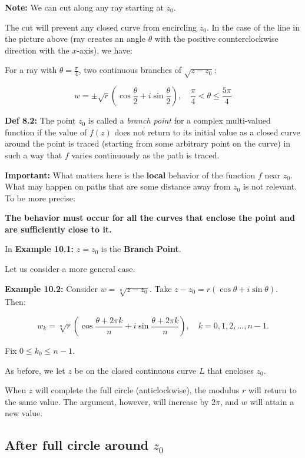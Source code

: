 \documentclass{article}
\begin{document}
\textbf{Note:} We can cut along any ray starting at \( z_0 \).

The cut will prevent any closed curve from encircling \( z_0 \). In the case of the line in the picture above (ray creates an angle \( \theta \) with the positive counterclockwise direction with the \( x \)-axis), we have:

For a ray with \( \theta = \frac{\pi}{4} \), two continuous branches of \( \sqrt{z - z_0} \):

\[
    w = \pm \sqrt{r} (\cos \frac{\theta}{2} + i \sin \frac{\theta}{2}), \quad \frac{\pi}{4} < \theta \leq \frac{5\pi}{4}
\]

\textbf{Def 8.2:} The point \( z_0 \) is called a \textit{branch point} for a complex multi-valued function if the value of \( f(z) \) does not return to its initial value as a closed curve around the point is traced (starting from some arbitrary point on the curve) in such a way that \( f \) varies continuously as the path is traced.

\textbf{Important:} What matters here is the \textbf{local} behavior of the function \( f \) near \( z_0 \). What may happen on paths that are some distance away from \( z_0 \) is not relevant. To be more precise:

\textbf{The behavior must occur for all the curves that enclose the point and are sufficiently close to it.}

In \textbf{Example 10.1:} \( z = z_0 \) is the \textbf{Branch Point}.

Let us consider a more general case.

\textbf{Example 10.2:} Consider \( w = \sqrt[n]{z - z_0} \). Take \( z - z_0 = r (\cos \theta + i \sin \theta) \). Then:

\[
w_k = \sqrt[n]{r} \left( \cos \frac{\theta + 2\pi k}{n} + i \sin \frac{\theta + 2\pi k}{n} \right), \quad k = 0,1,2, \dots, n-1.
\]

Fix \( 0 \leq k_0 \leq n-1 \).

As before, we let \( z \) be on the closed continuous curve \( L \) that encloses \( z_0 \). 

When \( z \) will complete the full circle (anticlockwise), the modulus \( r \) will return to the same value. The argument, however, will increase by \( 2\pi \), and \( w \) will attain a new value.

\subsection*{After full circle around \( z_0 \)}
\end{document}
